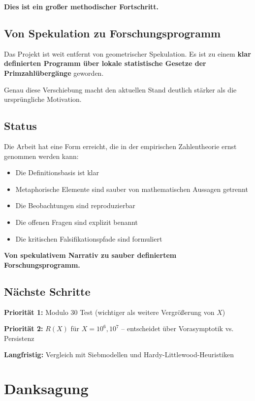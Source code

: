 \documentclass[11pt,a4paper]{article}
\begin{document}
\textbf{Dies ist ein großer methodischer Fortschritt.}

\subsection{Von Spekulation zu Forschungsprogramm}

Das Projekt ist weit entfernt von geometrischer Spekulation. Es ist zu einem \textbf{klar definierten Programm über lokale statistische Gesetze der Primzahlübergänge} geworden.

Genau diese Verschiebung macht den aktuellen Stand deutlich stärker als die ursprüngliche Motivation.

\subsection{Status}

Die Arbeit hat eine Form erreicht, die in der empirischen Zahlentheorie ernst genommen werden kann:

\begin{itemize}
\item Die Definitionsbasis ist klar
\item Metaphorische Elemente sind sauber von mathematischen Aussagen getrennt
\item Die Beobachtungen sind reproduzierbar
\item Die offenen Fragen sind explizit benannt
\item Die kritischen Falsifikationspfade sind formuliert
\end{itemize}

\textbf{Von spekulativem Narrativ zu sauber definiertem Forschungsprogramm.}

\subsection{Nächste Schritte}

\textbf{Priorität 1:} Modulo 30 Test (wichtiger als weitere Vergrößerung von $X$)

\textbf{Priorität 2:} $R(X)$ für $X = 10^6, 10^7$ -- entscheidet über Vorasymptotik vs. Persistenz

\textbf{Langfristig:} Vergleich mit Siebmodellen und Hardy-Littlewood-Heuristiken

\section*{Danksagung}
\end{document}
